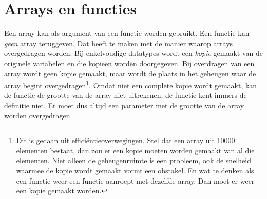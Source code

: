
%
%


\section{Arrays en functies}
Een array kan als argument van een functie worden gebruikt. Een functie kan \textsl{geen} array teruggeven. Dat heeft te maken met de manier waarop arrays overgedragen worden. Bij enkelvoudige datatypes wordt een \textsl{kopie} gemaakt van de originele variabelen en die kopieën worden doorgegeven. Bij overdragen van een array wordt geen kopie gemaakt, maar wordt de plaats in het geheugen waar de array begint overgedragen\footnote{Dit is gedaan uit efficiëntieoverwegingen. Stel dat een array uit 10000 elementen bestaat, dan zou er een kopie moeten worden gemaakt van al die elementen. Niet alleen de geheugenruimte is een probleem, ook de snelheid waarmee de kopie wordt gemaakt vormt een obstakel. En wat te denken als een functie weer een functie aanroept met dezelfde array. Dan moet er weer een kopie gemaakt worden.}. Omdat niet een complete kopie wordt gemaakt, kan de functie de grootte van de array niet uitrekenen; de functie kent immers de definitie niet. Er moet dus altijd een parameter met de grootte van de array worden overgedragen.


